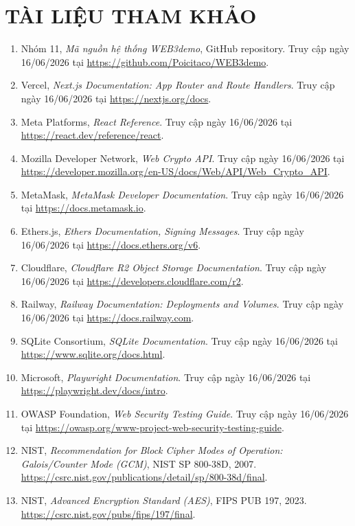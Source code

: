 \chapter*{TÀI LIỆU THAM KHẢO}
{}

\begin{enumerate}
  \item Nhóm 11, \textit{Mã nguồn hệ thống WEB3demo}, GitHub repository. Truy cập ngày 16/06/2026 tại \url{https://github.com/Poicitaco/WEB3demo}.
  \item Vercel, \textit{Next.js Documentation: App Router and Route Handlers}. Truy cập ngày 16/06/2026 tại \url{https://nextjs.org/docs}.
  \item Meta Platforms, \textit{React Reference}. Truy cập ngày 16/06/2026 tại \url{https://react.dev/reference/react}.
  \item Mozilla Developer Network, \textit{Web Crypto API}. Truy cập ngày 16/06/2026 tại \url{https://developer.mozilla.org/en-US/docs/Web/API/Web_Crypto_API}.
  \item MetaMask, \textit{MetaMask Developer Documentation}. Truy cập ngày 16/06/2026 tại \url{https://docs.metamask.io}.
  \item Ethers.js, \textit{Ethers Documentation, Signing Messages}. Truy cập ngày 16/06/2026 tại \url{https://docs.ethers.org/v6}.
  \item Cloudflare, \textit{Cloudflare R2 Object Storage Documentation}. Truy cập ngày 16/06/2026 tại \url{https://developers.cloudflare.com/r2}.
  \item Railway, \textit{Railway Documentation: Deployments and Volumes}. Truy cập ngày 16/06/2026 tại \url{https://docs.railway.com}.
  \item SQLite Consortium, \textit{SQLite Documentation}. Truy cập ngày 16/06/2026 tại \url{https://www.sqlite.org/docs.html}.
  \item Microsoft, \textit{Playwright Documentation}. Truy cập ngày 16/06/2026 tại \url{https://playwright.dev/docs/intro}.
  \item OWASP Foundation, \textit{Web Security Testing Guide}. Truy cập ngày 16/06/2026 tại \url{https://owasp.org/www-project-web-security-testing-guide}.
  \item NIST, \textit{Recommendation for Block Cipher Modes of Operation: Galois/Counter Mode (GCM)}, NIST SP 800-38D, 2007. \url{https://csrc.nist.gov/publications/detail/sp/800-38d/final}.
  \item NIST, \textit{Advanced Encryption Standard (AES)}, FIPS PUB 197, 2023. \url{https://csrc.nist.gov/pubs/fips/197/final}.
\end{enumerate}
